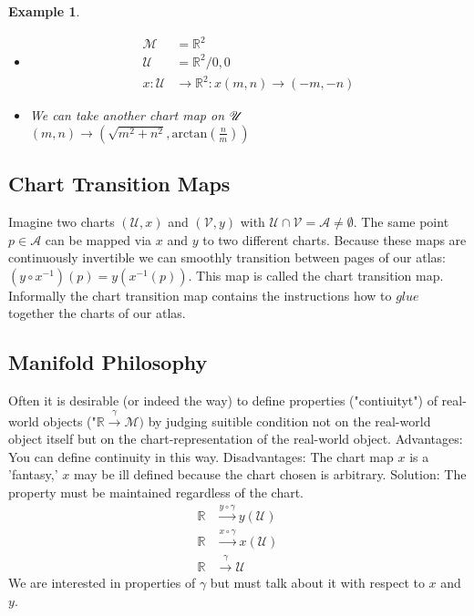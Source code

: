 \documentclass[10pt, oneside]{article}
\newcommand{\R}{\mathbb{R}}
\newcommand{\M}{\mathcal{M}}
\newtheorem{example}{Example}
\begin{document}
        \begin{example}
           \begin{itemize}
              \item \begin{align*}
                 \M &= \R^2 \\
                 \mathcal{U} &= \R^2 \slash {0,0} \\
                 x: \mathcal{U} &\to \R^2 : x(m,n) \to (-m,-n)
              \end{align*}
              \item We can take another chart map on $\mathcal{U}\\$
           $(m,n) \to (\sqrt{m^2+n^2}, \text{arctan}(\frac{n}{m}))$
           \end{itemize}
        \end{example}
     \subsection*{Chart Transition Maps}
        Imagine two charts $(\mathcal{U},x)$ and $(\mathcal{V},y)$ with $\mathcal{U} \cap \mathcal{V} = \mathcal{A} \neq \emptyset$. The same point $p \in \mathcal{A}$ can be mapped via $x$ and $y$ to two different charts.
        Because these maps are continuously invertible we can smoothly transition between pages of our atlas: $(y \circ x^{-1})(p) = y(x^{-1}(p))$.
        This map is called the chart transition map. Informally the chart transition map contains the instructions how to $glue$ together the charts of our atlas.
     \subsection*{Manifold Philosophy}
        Often it is desirable (or indeed the way) to define properties ("contiuityt") of real-world objects ("$\R \xrightarrow{\gamma}\M)$ by judging suitible condition not on the real-world object itself but on the chart-representation of the real-world object.
        Advantages: You can define continuity in this way.
        Disadvantages: The chart map $x$ is a 'fantasy,' $x$ may be ill defined because the chart chosen is arbitrary.
        Solution: The property must be maintained regardless of the chart.
        \begin{align*}
        \R &\xrightarrow{y \circ \gamma} y(\mathcal{U}) \\
        \R &\xrightarrow{x \circ \gamma} x(\mathcal{U}) \\
        \R &\xrightarrow{\gamma} \mathcal{U}
        \end{align*}
        We are interested in properties of $\gamma$ but must talk about it with respect to $x$ and $y$.
\end{document}
